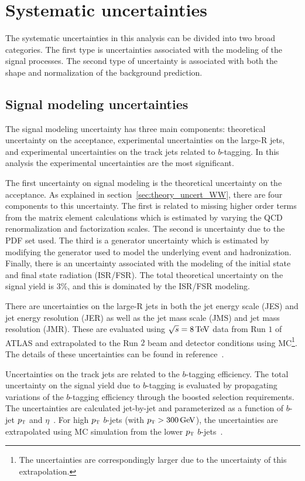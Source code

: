 \section{Systematic uncertainties}

The systematic uncertainties in this analysis can be divided into two broad categories. The first type is uncertainties associated with the modeling of the signal processes. The second type of uncertainty is associated with both the shape and normalization of the background prediction. 

\subsection{Signal modeling uncertainties}

The signal modeling uncertainty has three main components: theoretical uncertainty on the acceptance, experimental uncertainties on the large-R jets, and experimental uncertainties on the track jets related to $b$-tagging. In this analysis the experimental uncertainties are the most significant. 

The first uncertainty on signal modeling is the theoretical uncertainty on the acceptance. As explained in section~\ref{sec:theory_uncert_WW}, there are four components to this uncertainty. The first is related to missing higher order terms from the matrix element calculations which is estimated by varying the QCD renormalization and factorization scales. The second is uncertainty due to the PDF set used. The third is a generator uncertainty which is estimated by modifying the generator used to model the underlying event and hadronization. Finally, there is an uncertainty associated with the modeling of the initial state and final state radiation (ISR/FSR). The total theoretical uncertainty on the signal yield is $3\%$, and this is dominated by the ISR/FSR modeling.

There are uncertainties on the large-R jets in both the jet energy scale (JES) and jet energy resolution (JER) as well as the jet mass scale (JMS) and jet mass resolution (JMR). These are evaluated using $\sqrt{s} = 8 \TeV$ data from Run $1$ of ATLAS and extrapolated to the Run $2$ beam and detector conditions using MC\footnote{The uncertainties are correspondingly larger due to the uncertainty of this extrapolation.}. The details of these uncertainties can be found in reference~\cite{LargeRUncert}. 

Uncertainties on the track jets are related to the $b$-tagging efficiency. The total uncertainty on the signal yield due to $b$-tagging is evaluated by propagating variations of the $b$-tagging efficiency through the boosted selection requirements. The uncertainties are calculated jet-by-jet and parameterized as a function of $b$-jet $p_{\textrm{\footnotesize\sc t}}$ and $\eta$~\cite{BtagCalib1}. For high $p_{\textrm{\footnotesize\sc t}}$ $b$-jets (with $\pT > 300 \GeV$), the uncertainties are extrapolated using MC simulation from the lower $p_{\textrm{\footnotesize\sc t}}$ $b$-jets~\cite{BtagPaper}. 

